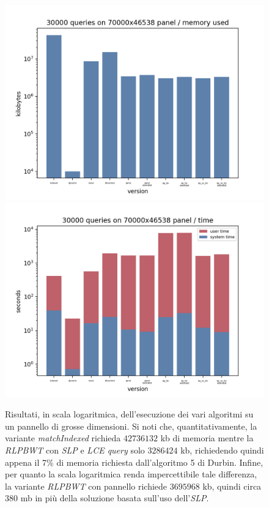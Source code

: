 \begin{figure}
  \centering
  \includegraphics[scale = 0.4]{img/mem.png}
  \includegraphics[scale = 0.4]{img/time.png}
  \caption{Risultati, in scala logaritmica, dell'esecuzione dei vari algoritmi
    su un pannello di grosse dimensioni. Si noti che, quantitativamente, la
    variante \textit{matchIndexed} richieda $42736132$ kb di memoria mentre la
    \textit{RLPBWT} con \textit{SLP} e \textit{LCE query} solo $3286424$ kb,
    richiedendo quindi appena il 7\% di memoria richiesta dall'algoritmo 5 di
    Durbin. Infine, per quanto la scala logaritmica renda impercettibile tale
    differenza, la variante \textit{RLPBWT} con pannello richiede $3695968$ kb,
    quindi circa $380$ mb in più della soluzione basata sull'uso
    dell'\textit{SLP}. } 
  \label{fig:bigres}
\end{figure}

